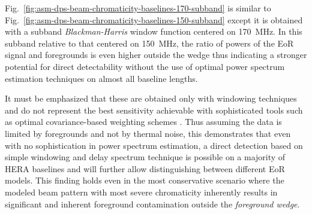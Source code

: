 \documentclass[preprint2,iop,numberedappendix,twocolappendix,appendixfloats]{emulateapj}
\begin{document}
Fig.~\ref{fig:asm-dps-beam-chromaticity-baselines-170-subband} is similar to Fig.~\ref{fig:asm-dps-beam-chromaticity-baselines-150-subband} except it is obtained with a subband {\it Blackman-Harris} window function centered on 170~MHz. In this subband relative to that centered on 150~MHz, the ratio of powers of the EoR signal and foregrounds is even higher outside the wedge thus indicating a stronger potential for direct detectability without the use of optimal power spectrum estimation techniques on almost all baseline lengths. 


It must be emphasized that these are obtained only with windowing techniques and do not represent the best sensitivity achievable with sophisticated tools such as optimal covariance-based weighting schemes \citep{liu14a,liu14b,ali15,dil15}. Thus assuming the data is limited by foregrounds and not by thermal noise, this demonstrates that even with no sophistication in power spectrum estimation, a direct detection based on simple windowing and delay spectrum technique is possible on a majority of HERA baselines and will further allow distinguishing between different EoR models. This finding holds even in the most conservative scenario where the modeled beam pattern with most severe chromaticity inherently results in significant and inherent foreground contamination outside the {\it foreground wedge}.
\end{document}

